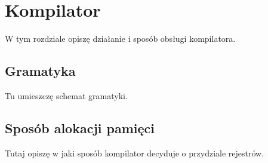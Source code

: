 \chapter{Kompilator}
\thispagestyle{chapterBeginStyle}

\iffalse
W tym rozdziale należy omówić zawartość pakietu instalacyjnego oraz założenia co do środowiska, w którym realizowany system będzie instalowany. Należy przedstawić procedurę instalacji i wdrożenia systemu. Czynności instalacyjne powinny być szczegółowo rozpisane na kroki. Procedura wdrożenia powinna obejmować konfigurację platformy sprzętowej, OS (np. konfiguracje niezbędnych sterowników) oraz konfigurację wdrażanego systemu, m.in.\ tworzenia niezbędnych kont użytkowników. Procedura instalacji powinna prowadzić od stanu, w którym nie są zainstalowane żadne składniki systemu, do stanu w którym system jest gotowy do pracy i oczekuje na akcje typowego użytkownika.
\fi

W tym rozdziale opiszę działanie i sposób obsługi kompilatora.

\section{Gramatyka}

Tu umieszczę schemat gramatyki.

\section{Sposób alokacji pamięci}

Tutaj opiszę w jaki sposób kompilator decyduje o przydziale rejestrów.